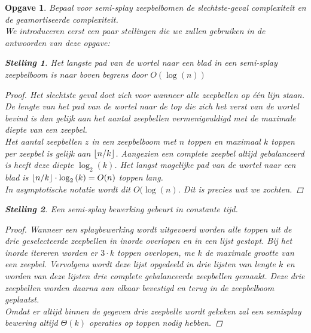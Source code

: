 \documentclass[12pt,hidelinks]{article}
\DeclarePairedDelimiter\floor{\lfloor}{\rfloor}
\newtheorem{opgave}{Opgave}
\newtheorem{stelling}{Stelling}
\begin{document}
    \begin{opgave}
        Bepaal voor semi-splay zeepbelbomen de slechtste-geval complexiteit en de geamortiseerde complexiteit.
        \\ \vspace{0.5em} \normalfont 
        We introduceren eerst een paar stellingen die we zullen gebruiken in de antwoorden van deze opgave:
        \begin{stelling}Het langste pad van de wortel naar een blad in een semi-splay zeepbelboom is naar boven begrens door $O(\log(n))$ \label{stelling1}
            \begin{proof}Het slechtste geval doet zich voor wanneer alle zeepbellen op één lijn staan.
                De lengte van het pad van de wortel naar de top die zich het verst van de wortel bevind is dan gelijk aan het aantal zeepbellen vermenigvuldigd met de maximale diepte van een zeepbel.
                \\
                Het aantal zeepbellen $z$ in een zeepbelboom met $n$ toppen en maximaal $k$ toppen per zeepbel is gelijk aan $\floor{n/k}$.
                Aangezien een complete zeepbel altijd gebalanceerd is heeft deze diepte $\log_2{(k)}$. 
                Het langst mogelijke pad van de wortel naar een blad is $\floor{n/k}\cdot\log_2{(k)} = O(n)$ toppen lang.
                \\
                In asymptotische notatie wordt dit $O(\log(n)$. Dit is precies wat we zochten.
            \end{proof}
        \end{stelling}
        \begin{stelling} Een semi-splay bewerking gebeurt in constante tijd. \label{stelling2}
            \begin{proof}
                Wanneer een splaybewerking wordt uitgevoerd worden alle toppen uit de drie geselecteerde zeepbellen in inorde overlopen en in een lijst gestopt.
                Bij het inorde itereren worden er $3\cdot k$ toppen overlopen, me $k$ de maximale grootte van een zeepbel.
                Vervolgens wordt deze lijst opgedeeld in drie lijsten van lengte $k$ en worden van deze lijsten drie complete gebalanceerde zeepbellen gemaakt.
                Deze drie zeepbellen worden daarna aan elkaar bevestigd en terug in de zeepbelboom geplaatst.
                \\
                Omdat er altijd binnen de gegeven drie zeepbelle wordt gekeken zal een semisplay bewering altijd $\Theta(k)$ operaties op toppen nodig hebben.

\end{proof}
\end{stelling}
\end{opgave}
\end{document}
